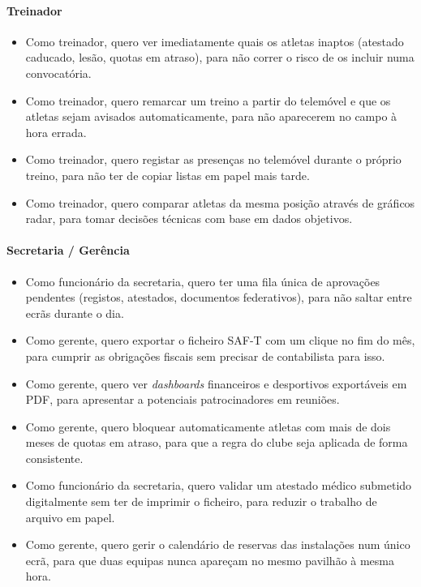\paragraph{Treinador}
\begin{itemize}
    \item Como treinador, quero ver imediatamente quais os atletas inaptos (atestado caducado, lesão, quotas em atraso), para não correr o risco de os incluir numa convocatória.
    \item Como treinador, quero remarcar um treino a partir do telemóvel e que os atletas sejam avisados automaticamente, para não aparecerem no campo à hora errada.
    \item Como treinador, quero registar as presenças no telemóvel durante o próprio treino, para não ter de copiar listas em papel mais tarde.
    \item Como treinador, quero comparar atletas da mesma posição através de gráficos radar, para tomar decisões técnicas com base em dados objetivos.
\end{itemize}

\paragraph{Secretaria / Gerência}
\begin{itemize}
    \item Como funcionário da secretaria, quero ter uma fila única de aprovações pendentes (registos, atestados, documentos federativos), para não saltar entre ecrãs durante o dia.
    \item Como gerente, quero exportar o ficheiro SAF-T com um clique no fim do mês, para cumprir as obrigações fiscais sem precisar de contabilista para isso.
    \item Como gerente, quero ver \textit{dashboards} financeiros e desportivos exportáveis em PDF, para apresentar a potenciais patrocinadores em reuniões.
    \item Como gerente, quero bloquear automaticamente atletas com mais de dois meses de quotas em atraso, para que a regra do clube seja aplicada de forma consistente.
    \item Como funcionário da secretaria, quero validar um atestado médico submetido digitalmente sem ter de imprimir o ficheiro, para reduzir o trabalho de arquivo em papel.
    \item Como gerente, quero gerir o calendário de reservas das instalações num único ecrã, para que duas equipas nunca apareçam no mesmo pavilhão à mesma hora.
\end{itemize}

